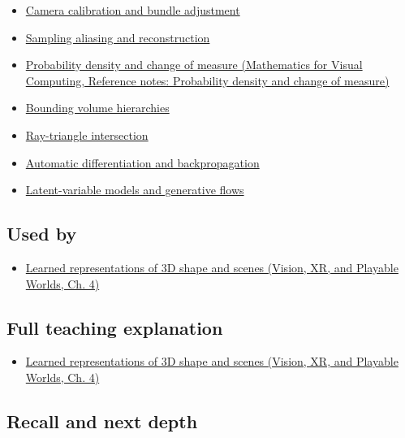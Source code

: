 \begin{itemize}
\tightlist
\item
  \hyperref[appendix-3ee9861904d5]{Camera calibration and bundle adjustment}
\item
  \hyperref[appendix-6a7869dd79a6]{Sampling aliasing and reconstruction}
\item
  \href{../02-Mathematics-for-Visual-Computing/main.pdf\#nameddest=appendix-4815cd87ab8b}{Probability density and change of measure (Mathematics for Visual Computing, Reference notes: Probability density and change of measure)}
\item
  \hyperref[appendix-0b426c47dd78]{Bounding volume hierarchies}
\item
  \hyperref[appendix-47ac1bd6d144]{Ray-triangle intersection}
\item
  \hyperref[appendix-40df0855b4a7]{Automatic differentiation and backpropagation}
\item
  \hyperref[appendix-2c568f05ee34]{Latent-variable models and generative flows}
\end{itemize}

\subsection{Used by}\label{appendix-c5b332e400e7-used-by}

\begin{itemize}
\tightlist
\item
  \href{../07-Vision-XR-and-Playable-Worlds/main.pdf\#nameddest=04-visual-computing-ii-ch034-learned-representations-of-3d-shape-and-scenes}{Learned representations of 3D shape and scenes (Vision, XR, and Playable Worlds, Ch. 4)}
\end{itemize}

\subsection{Full teaching explanation}\label{appendix-c5b332e400e7-full-teaching-explanation}

\begin{itemize}
\tightlist
\item
  \href{../07-Vision-XR-and-Playable-Worlds/main.pdf\#nameddest=04-visual-computing-ii-ch034-learned-representations-of-3d-shape-and-scenes}{Learned representations of 3D shape and scenes (Vision, XR, and Playable Worlds, Ch. 4)}
\end{itemize}

\subsection{Recall and next depth}\label{appendix-c5b332e400e7-recall-and-next-depth}

